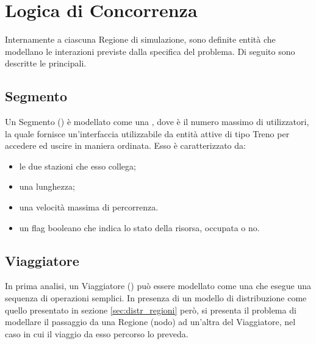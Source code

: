 \section{Logica di Concorrenza}

Internamente a ciascuna Regione di simulazione, sono definite entità che modellano le interazioni previste dalla specifica del problema. Di seguito sono descritte le principali.

	
	\subsection{Segmento}
	
	Un Segmento () è modellato come una , dove  è il numero massimo di utilizzatori, la quale fornisce un'interfaccia utilizzabile da entità attive di tipo Treno per accedere ed uscire in maniera ordinata. Esso è caratterizzato da:
			\begin{itemize}
				\item le due stazioni che esso collega;
				\item una lunghezza;
				\item una velocità massima di percorrenza.
				\item un flag booleano  che indica lo stato della risorsa, occupata o no.
			\end{itemize}


	\subsection{Viaggiatore}\label{subsec:traveler_def}		
	
	In prima analisi, un Viaggiatore () può essere modellato come una  che esegue una sequenza di operazioni semplici. In presenza di un modello di distribuzione come quello presentato in sezione \ref{sec:distr_regioni} però, si presenta il problema di modellare il passaggio da una Regione (nodo) ad un'altra del Viaggiatore, nel caso in cui il viaggio da esso percorso lo preveda.
	

